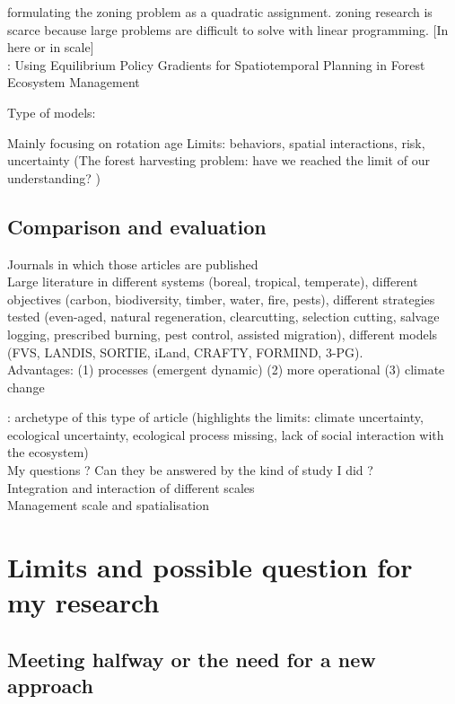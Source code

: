 \documentclass{article}
\begin{document}
\cite{bosZoningForestManagement1993} formulating the zoning problem as a quadratic assignment. zoning research is scarce because large problems are difficult to solve with linear programming. [In here or in scale]\\

\cite{crowleyUsingEquilibriumPolicy2014}: Using Equilibrium Policy Gradients for Spatiotemporal Planning in Forest Ecosystem Management

Type of models: 

Mainly focusing on rotation age
Limits: behaviors, spatial interactions, risk, uncertainty (The forest harvesting problem: have we reached the limit of our understanding? \cite{amacherForestHarvestingProblem2015}) \\

\subsection{Comparison and evaluation}

Journals in which those articles are published \\
Large literature in different systems (boreal, tropical, temperate), different objectives (carbon, biodiversity, timber, water, fire, pests), different strategies tested (even-aged, natural regeneration, clearcutting, selection cutting, salvage logging, prescribed burning, pest control, assisted migration), different models (FVS, LANDIS, SORTIE, iLand, CRAFTY, FORMIND, 3-PG). \\
Advantages: (1) processes (emergent dynamic) (2) more operational (3) climate change

\cite{duveneckEffectsAlternativeForest2014}: archetype of this type of article (highlights the limits: climate uncertainty, ecological uncertainty, ecological process missing, lack of social interaction with the ecosystem) \\

My questions ? Can they be answered by the kind of study I did ? \\
Integration and interaction of different scales \\
Management scale and spatialisation \\

\section{Limits and possible question for my research}

\subsection{Meeting halfway or the need for a new approach}
\end{document}
